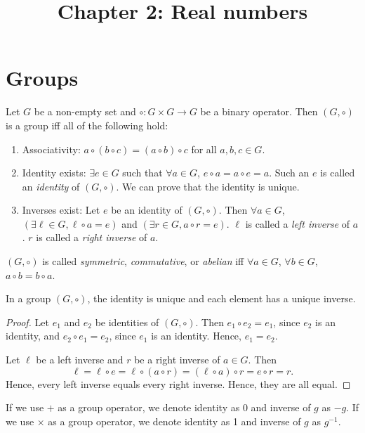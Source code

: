 \documentclass[a4paper, 12pt, fleqn]{article}
\author{\empty}
\date{\empty}
\title{Chapter 2: Real numbers}
\begin{document}
\maketitle
\setlength{\parskip}{0.2em}

\section{Groups}

\begin{definition}[Group]
Let $G$ be a non-empty set and $\circ: G \times G \to G$ be a binary operator.
Then $(G, \circ)$ is a group iff all of the following hold:
\begin{enumerate}
\item Associativity: $a \circ (b \circ c) = (a \circ b) \circ c$ for all $a, b, c \in G$.
\item Identity exists: $\exists e \in G$ such that $\forall a \in G$, $e \circ a = a \circ e = a$.
    Such an $e$ is called an \emph{identity} of $(G, \circ)$.
    We can prove that the identity is unique.
\item Inverses exist: Let $e$ be an identity of $(G, \circ)$. Then $\forall a \in G$,
    $(\exists \ell \in G, \ell \circ a = e)$ and $(\exists r \in G, a \circ r = e)$.
    $\ell$ is called a \emph{left inverse} of $a$. $r$ is called a \emph{right inverse} of $a$.
\end{enumerate}
$(G, \circ)$ is called \emph{symmetric}, \emph{commutative}, or \emph{abelian} iff
$\forall a \in G$, $\forall b \in G$, $a \circ b = b \circ a$.
\end{definition}

\begin{lemma}
In a group $(G, \circ)$, the identity is unique and each element has a unique inverse.
\end{lemma}
\begin{proof}
Let $e_1$ and $e_2$ be identities of $(G, \circ)$.
Then $e_1 \circ e_2 = e_1$, since $e_2$ is an identity, and $e_2 \circ e_1 = e_2$, since $e_1$ is an identity.
Hence, $e_1 = e_2$.

Let $\ell$ be a left inverse and $r$ be a right inverse of $a \in G$. Then
\[ \ell = \ell \circ e = \ell \circ (a \circ r) = (\ell \circ a) \circ r = e \circ r = r. \]
Hence, every left inverse equals every right inverse. Hence, they are all equal.
\end{proof}

If we use $+$ as a group operator, we denote identity as 0 and inverse of $g$ as $-g$.
If we use $\times$ as a group operator, we denote identity as 1 and inverse of $g$ as $g^{-1}$.
\end{document}
